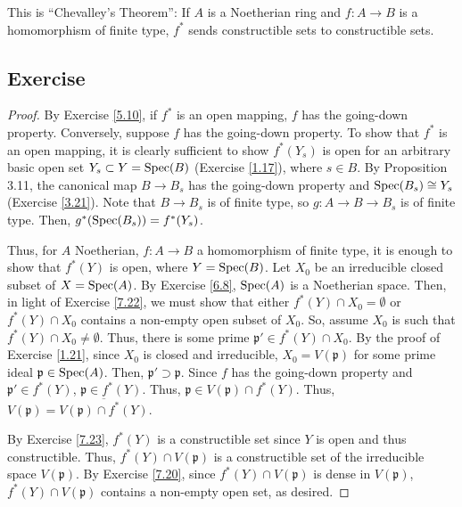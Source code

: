 \begin{remark}
This is ``Chevalley's Theorem'': If $A$ is a Noetherian ring and $f : A \to B$ is a homomorphism of finite type, $f^*$ sends constructible sets to constructible sets.
\end{remark}

\subsection{Exercise}\label{7.24}

\begin{proof}
By Exercise \ref{5.10}, if $f^*$ is an open mapping, $f$ has the going-down property. Conversely, suppose $f$ has the going-down property. To show
that $f^*$ is an open mapping, it is clearly sufficient to show $f^*(Y_s)$ is open for an arbitrary basic open set $Y_s \subset Y = \operatorname{Spec}(B)$ (Exercise \ref{1.17}),
where $s \in B$. By Proposition 3.11, the canonical map $B \to B_s$ has the going-down property and $\operatorname{Spec}(B_s) \cong Y_s$ (Exercise \ref{3.21}). Note that
$B \to B_s$ is of finite type, so $g : A \to B \to B_s$ is of finite type. Then, $g^*(\operatorname{Spec}(B_s)) = f^*(Y_s)$.

Thus, for $A$ Noetherian, $f : A \to B$ a homomorphism of finite type, it is enough to show that $f^*(Y)$ is open, where $Y = \operatorname{Spec}(B)$. Let $X_0$ be an
irreducible closed subset of $X = \operatorname{Spec}(A)$. By Exercise \ref{6.8}, $\operatorname{Spec}(A)$ is a Noetherian space. Then, in light of Exercise \ref{7.22}, we must show that
either $f^*(Y) \cap X_0 = \emptyset$ or $f^*(Y) \cap X_0$ contains a non-empty open subset of $X_0$. So, assume $X_0$ is such that $f^*(Y) \cap X_0 \neq \emptyset$.
Thus, there is some prime $\mathfrak{p}' \in f^*(Y) \cap X_0$. By the proof of Exercise \ref{1.21}, since $X_0$ is closed and irreducible, $X_0 = V(\mathfrak{p})$ 
for some prime ideal $\mathfrak{p} \in \operatorname{Spec}(A)$. Then, $\mathfrak{p}' \supset \mathfrak{p}$. Since $f$ has the going-down property and $\mathfrak{p}' \in f^*(Y)$,
$\mathfrak{p} \in f^*(Y)$. Thus, $\mathfrak{p} \in V(\mathfrak{p}) \cap f^*(Y)$. Thus, $V(\mathfrak{p}) = \overline{V(\mathfrak{p}) \cap f^*(Y)}$.

By Exercise \ref{7.23}, $f^*(Y)$ is a constructible set since $Y$ is open and thus constructible. Thus, $f^*(Y) \cap V(\mathfrak{p})$ is a constructible
set of the irreducible space $V(\mathfrak{p})$. By Exercise \ref{7.20}, since $f^*(Y) \cap V(\mathfrak{p})$ is dense in $V(\mathfrak{p})$, 
$f^*(Y) \cap V(\mathfrak{p})$ contains a non-empty open set, as desired.
\end{proof}


